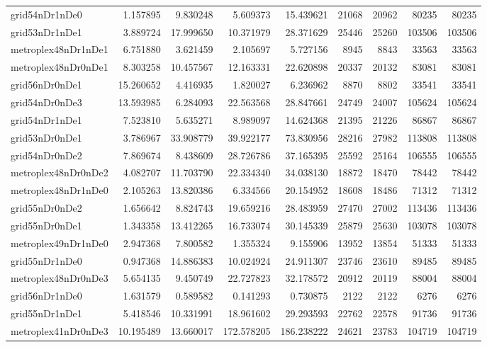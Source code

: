 \begin{longtable}{|l|r|r|r|r|r|r|r|r|}
grid54nDr1nDe0 & 1.157895 & 9.830248 & 5.609373 & 15.439621 & 21068 & 20962 & 80235 & 80235 \\
grid53nDr1nDe1 & 3.889724 & 17.999650 & 10.371979 & 28.371629 & 25446 & 25260 & 103506 & 103506 \\
metroplex48nDr1nDe1 & 6.751880 & 3.621459 & 2.105697 & 5.727156 & 8945 & 8843 & 33563 & 33563 \\
metroplex48nDr0nDe1 & 8.303258 & 10.457567 & 12.163331 & 22.620898 & 20337 & 20132 & 83081 & 83081 \\
grid56nDr0nDe1 & 15.260652 & 4.416935 & 1.820027 & 6.236962 & 8870 & 8802 & 33541 & 33541 \\
grid54nDr0nDe3 & 13.593985 & 6.284093 & 22.563568 & 28.847661 & 24749 & 24007 & 105624 & 105624 \\
grid54nDr1nDe1 & 7.523810 & 5.635271 & 8.989097 & 14.624368 & 21395 & 21226 & 86867 & 86867 \\
grid53nDr0nDe1 & 3.786967 & 33.908779 & 39.922177 & 73.830956 & 28216 & 27982 & 113808 & 113808 \\
grid54nDr0nDe2 & 7.869674 & 8.438609 & 28.726786 & 37.165395 & 25592 & 25164 & 106555 & 106555 \\
metroplex48nDr0nDe2 & 4.082707 & 11.703790 & 22.334340 & 34.038130 & 18872 & 18470 & 78442 & 78442 \\
metroplex48nDr1nDe0 & 2.105263 & 13.820386 & 6.334566 & 20.154952 & 18608 & 18486 & 71312 & 71312 \\
grid55nDr0nDe2 & 1.656642 & 8.824743 & 19.659216 & 28.483959 & 27470 & 27002 & 113436 & 113436 \\
grid55nDr0nDe1 & 1.343358 & 13.412265 & 16.733074 & 30.145339 & 25879 & 25630 & 103078 & 103078 \\
metroplex49nDr1nDe0 & 2.947368 & 7.800582 & 1.355324 & 9.155906 & 13952 & 13854 & 51333 & 51333 \\
grid55nDr1nDe0 & 0.947368 & 14.886383 & 10.024924 & 24.911307 & 23746 & 23610 & 89485 & 89485 \\
metroplex48nDr0nDe3 & 5.654135 & 9.450749 & 22.727823 & 32.178572 & 20912 & 20119 & 88004 & 88004 \\
grid56nDr1nDe0 & 1.631579 & 0.589582 & 0.141293 & 0.730875 & 2122 & 2122 & 6276 & 6276 \\
grid55nDr1nDe1 & 5.418546 & 10.331991 & 18.961602 & 29.293593 & 22762 & 22578 & 91736 & 91736 \\
metroplex41nDr0nDe3 & 10.195489 & 13.660017 & 172.578205 & 186.238222 & 24621 & 23783 & 104719 & 104719 \\

\end{longtable}
